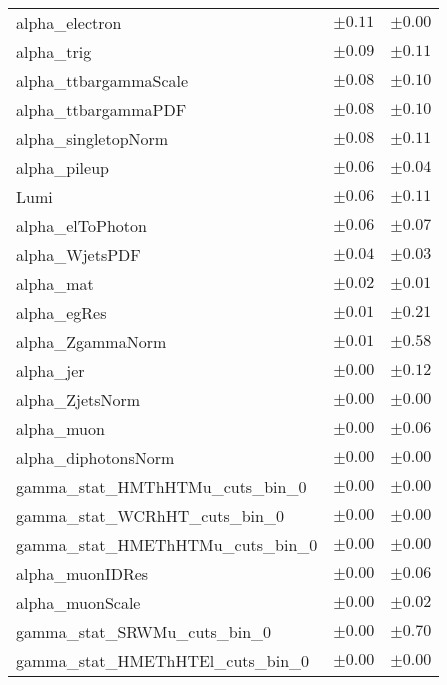 \begin{table}
\begin{center}
\begin{tabular*}{\textwidth}{@{\extracolsep{\fill}}lcc}
alpha\_electron         & $\pm 0.11$          & $\pm 0.00$       \\
alpha\_trig         & $\pm 0.09$          & $\pm 0.11$       \\
alpha\_ttbargammaScale         & $\pm 0.08$          & $\pm 0.10$       \\
alpha\_ttbargammaPDF         & $\pm 0.08$          & $\pm 0.10$       \\
alpha\_singletopNorm         & $\pm 0.08$          & $\pm 0.11$       \\
alpha\_pileup         & $\pm 0.06$          & $\pm 0.04$       \\
Lumi         & $\pm 0.06$          & $\pm 0.11$       \\
alpha\_elToPhoton         & $\pm 0.06$          & $\pm 0.07$       \\
alpha\_WjetsPDF         & $\pm 0.04$          & $\pm 0.03$       \\
alpha\_mat         & $\pm 0.02$          & $\pm 0.01$       \\
alpha\_egRes         & $\pm 0.01$          & $\pm 0.21$       \\
alpha\_ZgammaNorm         & $\pm 0.01$          & $\pm 0.58$       \\
alpha\_jer         & $\pm 0.00$          & $\pm 0.12$       \\
alpha\_ZjetsNorm         & $\pm 0.00$          & $\pm 0.00$       \\
alpha\_muon         & $\pm 0.00$          & $\pm 0.06$       \\
alpha\_diphotonsNorm         & $\pm 0.00$          & $\pm 0.00$       \\
gamma\_stat\_HMThHTMu\_cuts\_bin\_0         & $\pm 0.00$          & $\pm 0.00$       \\
gamma\_stat\_WCRhHT\_cuts\_bin\_0         & $\pm 0.00$          & $\pm 0.00$       \\
gamma\_stat\_HMEThHTMu\_cuts\_bin\_0         & $\pm 0.00$          & $\pm 0.00$       \\
alpha\_muonIDRes         & $\pm 0.00$          & $\pm 0.06$       \\
alpha\_muonScale         & $\pm 0.00$          & $\pm 0.02$       \\
gamma\_stat\_SRWMu\_cuts\_bin\_0         & $\pm 0.00$          & $\pm 0.70$       \\
gamma\_stat\_HMEThHTEl\_cuts\_bin\_0         & $\pm 0.00$          & $\pm 0.00$       \\

\end{tabular*}
\end{center}
\end{table}
